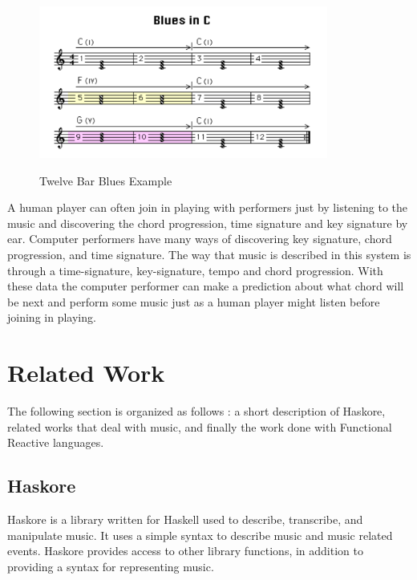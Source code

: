 \documentclass[12pt]{ucthesis}
\newcommand{\captionfonts}{\small\bf\ssp}
\begin{document}
\begin{figure}
\includegraphics[height=50mm]{blues-example.pdf}
\captionfonts
\caption[Twelve Bar Blues Example]{Twelve Bar Blues Example}
\label{fig:blues-example}
\end{figure}

A human player can often join in playing with performers just by listening to the music and discovering the chord progression, time signature and key signature by ear. Computer performers have many ways of discovering key signature, chord progression, and time signature. The way that music is described in this system is through a time-signature, key-signature, tempo and chord progression. With these data the computer performer can make a prediction about what chord will be next and perform some music just as a human player might listen before joining in playing.


\chapter{Related Work}
\label{rw}

The following section is organized as follows : a short description of Haskore, related works that deal with music, and finally the work done with Functional Reactive languages.

\section{Haskore}
\label{rw:haskore}

Haskore is a library written for Haskell used to describe, transcribe, and manipulate music. It uses a simple syntax to describe music and music related events. Haskore provides access to other library functions, in addition to providing a syntax for representing music. 
\end{document}
